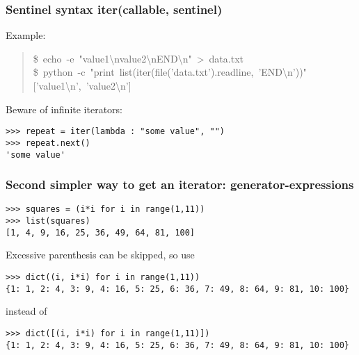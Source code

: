 \documentclass[10pt,a4paper,english]{article}
\begin{document}

\hypertarget{sentinel-syntax-iter-callable-sentinel}{}
\subsubsection*{Sentinel syntax iter(callable, sentinel)}

Example:
\begin{quote}{\ttfamily \raggedright \noindent
{\$}~echo~-e~"value1{\textbackslash}nvalue2{\textbackslash}nEND{\textbackslash}n"~>~data.txt~\\
{\$}~python~-c~"print~list(iter(file('data.txt').readline,~'END{\textbackslash}n'))"~\\
{[}'value1{\textbackslash}n',~'value2{\textbackslash}n']
}\end{quote}

Beware of infinite iterators:
\begin{verbatim}>>> repeat = iter(lambda : "some value", "")
>>> repeat.next()
'some value'\end{verbatim}



\hypertarget{second-simpler-way-to-get-an-iterator-generator-expressions}{}
\subsubsection*{Second simpler way to get an iterator: generator-expressions}
\begin{verbatim}>>> squares = (i*i for i in range(1,11)) 
>>> list(squares)
[1, 4, 9, 16, 25, 36, 49, 64, 81, 100]\end{verbatim}

Excessive parenthesis can be skipped, so use
\begin{verbatim}>>> dict((i, i*i) for i in range(1,11))
{1: 1, 2: 4, 3: 9, 4: 16, 5: 25, 6: 36, 7: 49, 8: 64, 9: 81, 10: 100}\end{verbatim}

instead of
\begin{verbatim}>>> dict([(i, i*i) for i in range(1,11)])
{1: 1, 2: 4, 3: 9, 4: 16, 5: 25, 6: 36, 7: 49, 8: 64, 9: 81, 10: 100}\end{verbatim}
\end{document}
